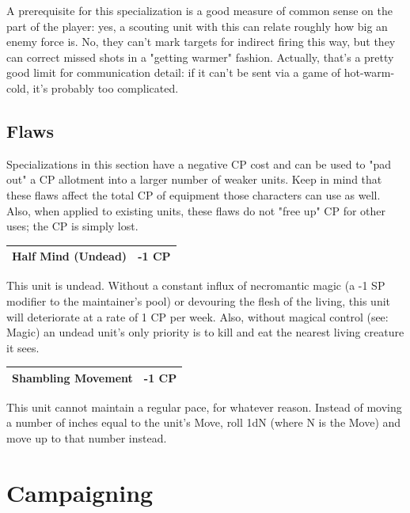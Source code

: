 \documentclass[12pt,a4paper,twocolumn]{article}
\begin{document}
A prerequisite for this specialization is a good measure of common sense on the part of the player: yes, a scouting unit with this can relate roughly how big an enemy force is.  No, they can't mark targets for indirect firing this way, but they can correct missed shots in a "getting warmer" fashion.  Actually, that's a pretty good limit for communication detail: if it can't be sent via a game of hot-warm-cold, it's probably too complicated.

\subsection{Flaws}

Specializations in this section have a negative CP cost and can be used to "pad out" a CP allotment into a larger number of weaker units.  Keep in mind that these flaws affect the total CP of equipment those characters can use as well.  Also, when applied to existing units, these flaws do not "free up" CP for other uses; the CP is simply lost.

\begin{tabular}{|l|c|} \hline
Half Mind (Undead) & -1 CP \\ \hline
\end{tabular}

This unit is undead.  Without a constant influx of necromantic magic (a -1 SP modifier to the maintainer's pool) or devouring the flesh of the living, this unit will deteriorate at a rate of 1 CP per week.  Also, without magical control (see: Magic) an undead unit's only priority is to kill and eat the nearest living creature it sees.

\begin{tabular}{|l|c|} \hline
Shambling Movement & -1 CP \\ \hline
\end{tabular}

This unit cannot maintain a regular pace, for whatever reason.  Instead of moving a number of inches equal to the unit's Move, roll 1dN (where N is the Move) and move up to that number instead.


\section {Campaigning }
\end{document}
